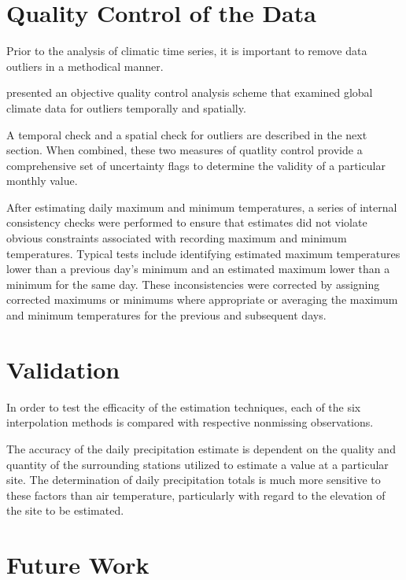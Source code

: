 \documentclass[WHATMANUAL.tex]{subfiles}
\begin{document}
\section{Quality Control of the Data}

Prior to the analysis of climatic time series, it is important to remove data outliers in a methodical manner.

\cite{eischeid_quality_1995} presented an objective quality control analysis scheme that examined global climate data for outliers temporally and spatially.

A temporal check and a spatial check for outliers are described in the next section. When combined, these two measures of quatlity control provide a comprehensive set of uncertainty flags to determine the validity of a particular monthly value.

After estimating daily maximum and minimum temperatures, a series of internal consistency checks were
performed to ensure that estimates did not violate obvious constraints associated with recording maximum
and minimum temperatures. Typical tests include identifying estimated maximum temperatures lower than a
previous day’s minimum and an estimated maximum lower than a minimum for the same day. These inconsistencies were corrected by assigning corrected maximums or minimums where appropriate
or averaging the maximum and minimum temperatures for the previous and subsequent days.

\section{Validation}

In order to test the efficacity of the estimation techniques, each of the six interpolation methods is compared with respective nonmissing observations.

The accuracy of the daily precipitation estimate is dependent on the quality and quantity of the surrounding stations utilized to estimate a value at a particular site. The determination of daily precipitation totals is much more sensitive to these factors than air temperature, particularly with regard to the elevation of the site to be estimated.

\section{Future Work}
\end{document}
